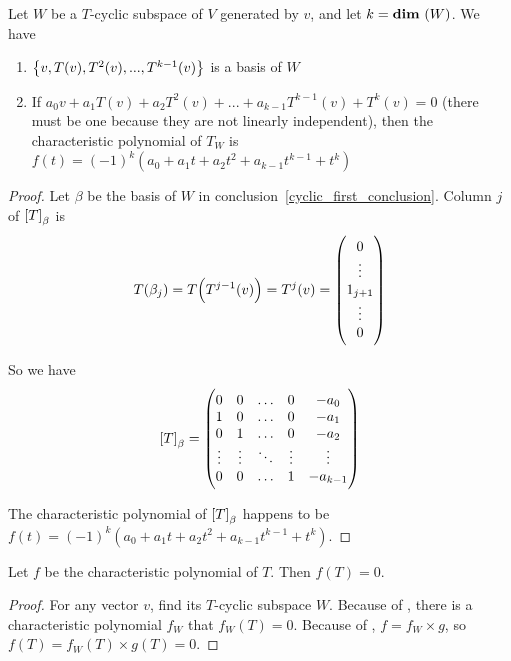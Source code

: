 \begin{theorem}\label{char_poly_of_invariant_subspace}
    Let $W$ be a $T$-cyclic subspace of $V$ generated by $v$, and let $k = \dimension{W}$. We have
    \begin{enumerate}
        \item $\set{v, T(v), T^2(v), ..., T^{k-1}(v)}$ is a basis of $W$\label{cyclic_first_conclusion}
        \item If $a_0 v + a_1 T(v) + a_2 T^2(v) + ... + a_{k-1} T^{k-1} (v) + T^k (v) = 0$ (there must be one because they are not linearly independent), then the characteristic polynomial of $T_W$ is $f(t) = (-1)^k (a_0 + a_1 t + a_2 t^2 + a_{k-1} t^{k-1} + t^k)$
    \end{enumerate}
\end{theorem}
\begin{proof}
    Let $\beta$ be the basis of $W$ in conclusion~\ref{cyclic_first_conclusion}. Column $j$ of $\coordinate{T}_\beta$ is 
    \begin{equation*}
        T(\beta_j) = T\mleft(T^{j-1}(v)\mright) = T^{j}(v) = \begin{pmatrix}
            0 \\
            \vdots \\
            1_{j+1} \\
            \vdots \\
            0
        \end{pmatrix}
    \end{equation*}
    
    So we have 
    \begin{equation*}
        \coordinate{T}_\beta = \begin{pmatrix}
            0 & 0 & \hdots & 0 & -a_0 \\
            1 & 0 & \hdots & 0 & -a_1 \\
            0 & 1 & \hdots & 0 & -a_2 \\
            \vdots & \vdots & \ddots & \vdots & \vdots \\
            0 & 0 & \hdots & 1 & -a_{k-1}
        \end{pmatrix}
    \end{equation*}
    
    The characteristic polynomial of $\coordinate{T}_\beta$ happens to be $f(t) = (-1)^k (a_0 + a_1 t + a_2 t^2 + a_{k-1} t^{k-1} + t^k)$.
\end{proof}

\begin{theorem}
    Let $f$ be the characteristic polynomial of $T$. Then $f(T) = 0$.
\end{theorem}
\begin{proof}
    For any vector $v$, find its $T$-cyclic subspace $W$. Because of , there is a characteristic polynomial $f_W$ that $f_W(T) = 0$. Because of , $f = f_W \times g$, so $f(T) = f_W(T) \times g(T) = 0$.
\end{proof}



